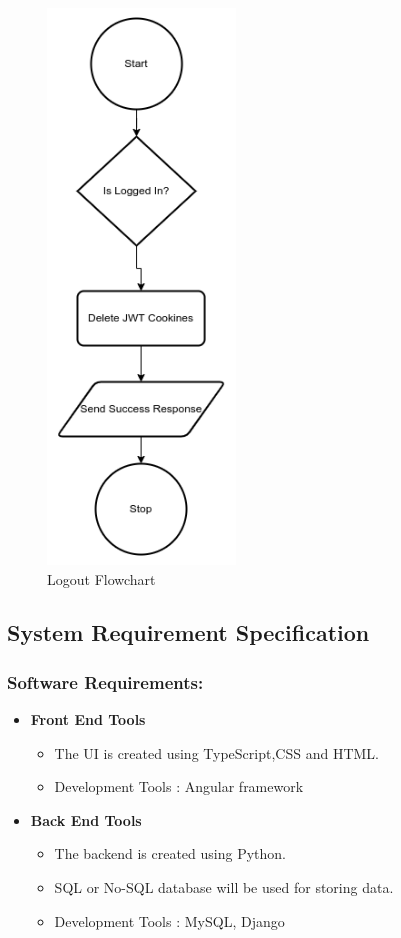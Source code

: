 \documentclass[12pt]{article}
\begin{document}
\begin{figure}[h]
    \centerline{\includegraphics[width = 50mm]{logout.drawio.png}}
    \caption{Logout Flowchart}
    \label{fig}
\end{figure}


\clearpage
\subsection{System Requirement Specification}
\subsubsection{Software Requirements:}
\begin{itemize}
    \item \textbf{Front End Tools}
        \begin{itemize}
            \item The UI is created using TypeScript,CSS and HTML.
            \item Development Tools : Angular framework
        \end{itemize}
    \item \textbf{Back End Tools}
        \begin{itemize}
            \item The backend is created using Python.
            \item SQL or No-SQL database will be used for storing data.
            \item Development Tools : MySQL, Django
        \end{itemize}
\end{itemize}
\end{document}
